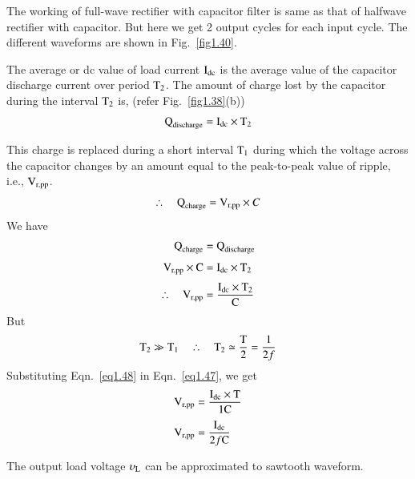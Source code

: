 The working of full-wave rectifier with capacitor filter is same as that of halfwave rectifier with capacitor. But here we get 2 output cycles for each input cycle. The different waveforms are shown in Fig.~\ref{fig1.40}.

The average or dc value of load current $\textrm{I}_{\text{dc}}$ is the average value of the capacitor discharge current over period $\textrm{T}_{2}$. The amount of charge lost by the capacitor during the interval $\textrm{T}_{2}$ is, (refer Fig.~\ref{fig1.38}(b))
\begin{equation}
\textrm{Q}_{\text{discharge}}=\textrm{I}_{\text{dc}}\times \textrm{T}_{2}\label{eq1.45}
\end{equation}

This charge is replaced during a short interval $\textrm{T}_{1}$ during which the voltage across the capacitor changes by an amount equal to the peak-to-peak value of ripple, i.e., $\textrm{V}_{\text{r,pp}}$.
\begin{equation}
\therefore\quad \textrm{Q}_{\text{charge}}=\textrm{V}_{\text{r,pp}}\times C\label{eq1.46}
\end{equation}
We have
\begin{align}
\textrm{Q}_{\text{charge}} &= \textrm{Q}_{\text{discharge}}\notag\\[3pt]
\textrm{V}_{\text{r,pp}}\times \textrm{C} &= \textrm{I}_{\text{dc}}\times \textrm{T}_{2}\notag\\[3pt]
\therefore\quad \textrm{V}_{\text{r,pp}} &= \frac{\textrm{I}_{\text{dc}}\times \textrm{T}_{2}}{\textrm{C}}\label{eq1.47}
\end{align}
But
\begin{equation}
\textrm{T}_{2}\gg \textrm{T}_{1}\quad\therefore\quad \textrm{T}_{2}\simeq \dfrac{\textrm{T}}{2}=\frac{1}{2f}\label{eq1.48}
\end{equation}
Substituting Eqn.~\eqref{eq1.48} in Eqn.~\eqref{eq1.47}, we get
\begin{align}
\textrm{V}_{\text{r,pp}} &= \dfrac{\textrm{I}_{\text{dc}}\times \textrm{T}}{1\textrm{C}}\notag\\[3pt]
\textrm{V}_{\text{r,pp}} &= \frac{\textrm{I}_{\text{dc}}}{2f\textrm{C}}\label{eq1.49}
\end{align}

The output load voltage $\upsilon_{\textrm{L}}$ can be approximated to sawtooth waveform.


